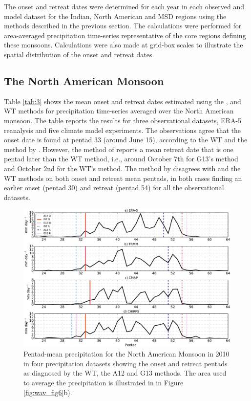 The onset and retreat dates were determined for each year in each observed and model dataset for the Indian, North American and MSD regions using the methods described in the previous section. The calculations were performed for area-averaged precipitation time-series representative of the core regions defining these monsoons. Calculations were also made at grid-box scales to illustrate the spatial distribution of the onset and retreat dates. 


\subsection{The North American Monsoon}






Table \ref{tab:3} shows the mean onset and retreat dates estimated using the ,  and WT methods for precipitation time-series averaged over the North American monsoon.
The table reports the results for three observational datasets, ERA-5 reanalysis and five climate model experiments.
The observations  agree that the onset date is found at pentad 33 (around June 15), according to the WT and the method by .
However, the method of  reports a mean retreat date that is one pentad later than the WT method, i.e., around October 7th for G13's method and October 2nd for the WT's method.
The method by  disagrees with  and the WT methods on both onset and retreat mean pentads, in both cases finding an earlier onset (pentad 30) and retreat (pentad 54) for all the observational datasets. 

\begin{figure}[t!]
\centering
 \includegraphics[width=\linewidth]{figures/wav_fig5.pdf}
\caption[Comparison of methods in 2010 in the North American Monsoon]{  Pentad-mean precipitation for the North American Monsoon in 2010 in four precipitation datasets showing the onset and retreat pentads as diagnosed by the WT, the A12 and G13 methods. The area used to average the precipitation is illustrated in in Figure \ref{fig:wav_fig6}b).} 
\label{fig:wav_compari}
\end{figure}


